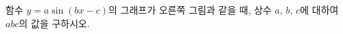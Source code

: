 \noindent\begin{minipage}[t]{0.58\linewidth}\vspace{0pt}\raggedright 함수 $y=a\sin (bx-c)$의 그래프가 오른쪽 그림과 같을 때, 상수 $a$, $b$, $c$에 대하여 $abc$의 값을 구하시오. \end{minipage}\hfill\begin{minipage}[t]{0.4\linewidth}\vspace{0pt}\centering \resizebox{\ifdim\width>\linewidth\linewidth\else\width\fi}{!}{}\end{minipage}\par
